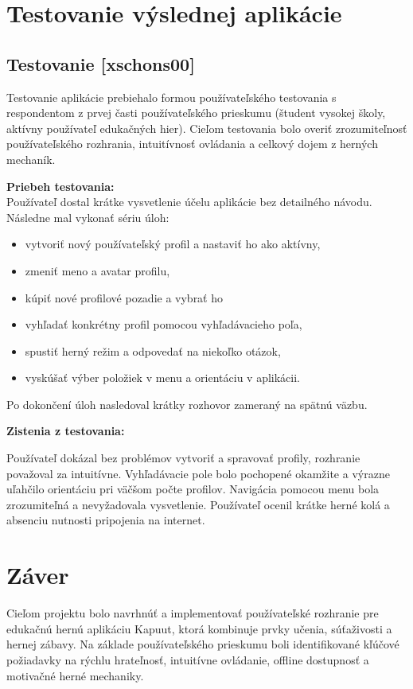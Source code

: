\documentclass[a4paper,12pt]{article}
\begin{document}
\section{Testovanie výslednej aplikácie}
\subsection{Testovanie [xschons00]}

Testovanie aplikácie prebiehalo formou používateľského testovania s respondentom z prvej časti používateľského prieskumu (študent vysokej školy, aktívny používateľ edukačných hier). Cieľom testovania bolo overiť zrozumiteľnosť používateľského rozhrania, intuitívnosť ovládania a celkový dojem z herných mechaník.

\textbf{Priebeh testovania:}
\\
Používateľ dostal krátke vysvetlenie účelu aplikácie bez detailného návodu.
Následne mal vykonať sériu úloh:
    \begin{itemize}
        \item vytvoriť nový používateľský profil a nastaviť ho ako aktívny,
        \item zmeniť meno a avatar profilu,
        \item kúpiť nové profilové pozadie a vybrať ho
        \item vyhľadať konkrétny profil pomocou vyhľadávacieho poľa,
        \item spustiť herný režim a odpovedať na niekoľko otázok,
        \item vyskúšať výber položiek v menu a orientáciu v aplikácii.
    \end{itemize}
    Po dokončení úloh nasledoval krátky rozhovor zameraný na spätnú väzbu.


\textbf{Zistenia z testovania:}

    Používateľ dokázal bez problémov vytvoriť a spravovať profily, rozhranie považoval za intuitívne.
    Vyhľadávacie pole bolo pochopené okamžite a výrazne uľahčilo orientáciu pri väčšom počte profilov.
   Navigácia pomocou menu bola zrozumiteľná a nevyžadovala vysvetlenie.
    Používateľ ocenil krátke herné kolá a absenciu nutnosti pripojenia na internet.

	
\section{Záver}

Cieľom projektu bolo navrhnúť a implementovať používateľské rozhranie pre edukačnú hernú aplikáciu Kapuut, ktorá kombinuje prvky učenia, súťaživosti a hernej zábavy. Na základe používateľského prieskumu boli identifikované kľúčové požiadavky na rýchlu hrateľnosť, intuitívne ovládanie, offline dostupnosť a motivačné herné mechaniky.
\end{document}
